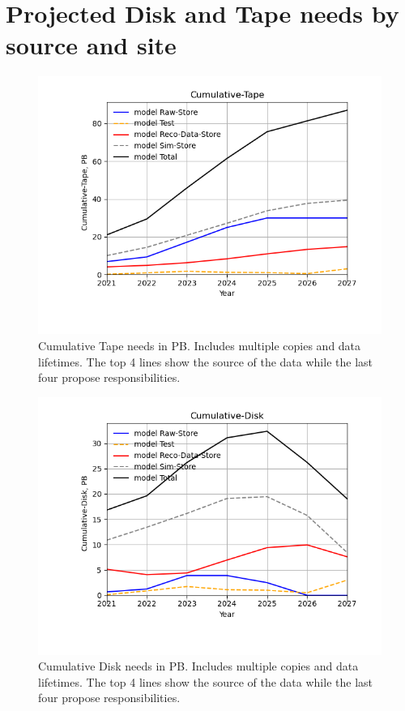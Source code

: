 \section{Projected Disk and Tape needs by source and site}
\begin{figure}[h]
\centering\includegraphics[height=0.4\textwidth]{MoreSim_2023-01-31-2027/MoreSim_2023-01-31-2027-Cumulative-Tape.png}
\caption{Cumulative Tape needs in PB. Includes multiple copies and data lifetimes. The top 4 lines show the source of the data while the last four propose responsibilities.}
\label{fig:Cumulative-Tape}
\end{figure}
\begin{figure}[h]
\centering\includegraphics[height=0.4\textwidth]{MoreSim_2023-01-31-2027/MoreSim_2023-01-31-2027-Cumulative-Disk.png}
\caption{Cumulative Disk needs in PB. Includes multiple copies and data lifetimes. The top 4 lines show the source of the data while the last four propose responsibilities.}
\label{fig:Cumulative-Disk}
\end{figure}
